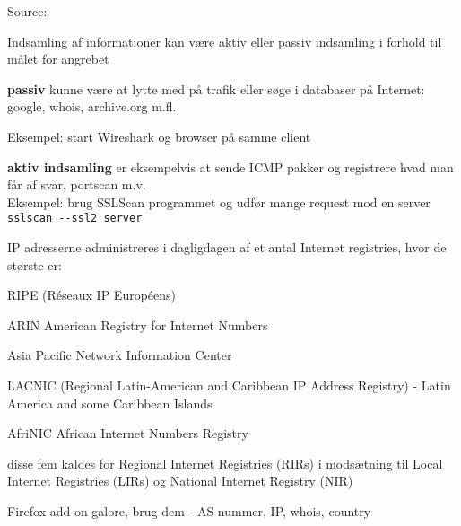 \documentclass[20pt,landscape,a4paper,footrule]{foils}
\begin{document}
Source: 



\begin{list1}
\item Indsamling af informationer kan være aktiv eller passiv indsamling i forhold
  til målet for angrebet
\item {\bf passiv} kunne være at lytte med på trafik eller søge i databaser
  på Internet: google, whois, archive.org m.fl.

Eksempel: start Wireshark og browser på samme client

\vskip 1cm
\item {\bf aktiv indsamling} er eksempelvis at sende ICMP pakker og
  registrere hvad man får af svar, portscan m.v.\\

Eksempel: brug SSLScan programmet og udfør mange request mod en server\\
\verb+sslscan --ssl2 server+
\end{list1}



\begin{list1}
\item IP adresserne administreres i dagligdagen af et antal Internet
  registries, hvor de største er:
\begin{list2}
\item RIPE (Réseaux IP Européens)  
\item ARIN American Registry for Internet Numbers 
\item Asia Pacific Network Information Center 
\item LACNIC (Regional Latin-American and Caribbean IP Address
  Registry) - Latin America and some Caribbean Islands
\item AfriNIC African Internet Numbers Registry 
\end{list2}
\item disse fem kaldes for Regional Internet Registries (RIRs) i
  modsætning til Local Internet Registries (LIRs) og National Internet
  Registry (NIR)
\end{list1}

\vskip 1cm
\centerline{Firefox add-on galore, brug dem - AS nummer, IP, whois, country}
\end{document}
